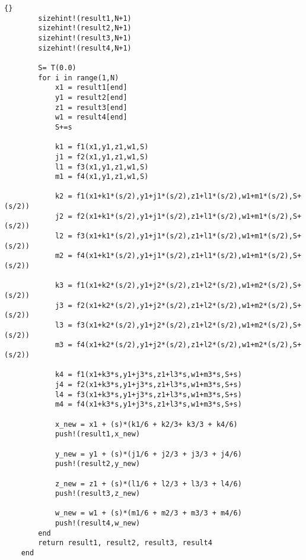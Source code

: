 \begin{lstlisting}[caption =\text{numerical\_scheme.jl}, label = a]{}
        sizehint!(result1,N+1)
        sizehint!(result2,N+1)
        sizehint!(result3,N+1)
        sizehint!(result4,N+1)

        S= T(0.0)
        for i in range(1,N)
            x1 = result1[end]
            y1 = result2[end]
            z1 = result3[end]
            w1 = result4[end]
            S+=s

            k1 = f1(x1,y1,z1,w1,S)
            j1 = f2(x1,y1,z1,w1,S)
            l1 = f3(x1,y1,z1,w1,S)
            m1 = f4(x1,y1,z1,w1,S)

            k2 = f1(x1+k1*(s/2),y1+j1*(s/2),z1+l1*(s/2),w1+m1*(s/2),S+(s/2))
            j2 = f2(x1+k1*(s/2),y1+j1*(s/2),z1+l1*(s/2),w1+m1*(s/2),S+(s/2))
            l2 = f3(x1+k1*(s/2),y1+j1*(s/2),z1+l1*(s/2),w1+m1*(s/2),S+(s/2))
            m2 = f4(x1+k1*(s/2),y1+j1*(s/2),z1+l1*(s/2),w1+m1*(s/2),S+(s/2))

            k3 = f1(x1+k2*(s/2),y1+j2*(s/2),z1+l2*(s/2),w1+m2*(s/2),S+(s/2))
            j3 = f2(x1+k2*(s/2),y1+j2*(s/2),z1+l2*(s/2),w1+m2*(s/2),S+(s/2))
            l3 = f3(x1+k2*(s/2),y1+j2*(s/2),z1+l2*(s/2),w1+m2*(s/2),S+(s/2))
            m3 = f4(x1+k2*(s/2),y1+j2*(s/2),z1+l2*(s/2),w1+m2*(s/2),S+(s/2))

            k4 = f1(x1+k3*s,y1+j3*s,z1+l3*s,w1+m3*s,S+s)
            j4 = f2(x1+k3*s,y1+j3*s,z1+l3*s,w1+m3*s,S+s)
            l4 = f3(x1+k3*s,y1+j3*s,z1+l3*s,w1+m3*s,S+s)
            m4 = f4(x1+k3*s,y1+j3*s,z1+l3*s,w1+m3*s,S+s)

            x_new = x1 + (s)*(k1/6 + k2/3+ k3/3 + k4/6)
            push!(result1,x_new)

            y_new = y1 + (s)*(j1/6 + j2/3 + j3/3 + j4/6)
            push!(result2,y_new)

            z_new = z1 + (s)*(l1/6 + l2/3 + l3/3 + l4/6)
            push!(result3,z_new)

            w_new = w1 + (s)*(m1/6 + m2/3 + m3/3 + m4/6)
            push!(result4,w_new)
        end
        return result1, result2, result3, result4
    end
\end{lstlisting}